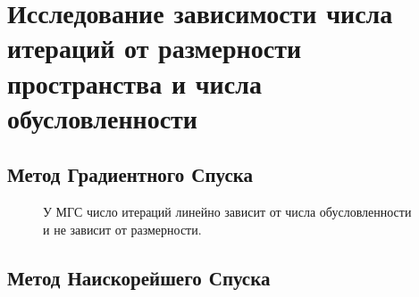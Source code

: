 \documentclass[a4paper,12pt]{article}
\begin{document}
\section{Исследование зависимости числа итераций от размерности пространства и числа обусловленности}

\subsection{Метод Градиентного Спуска}

\begin{figure}[h]
\caption{У МГС число итераций линейно зависит от числа обусловленности и не зависит от размерности.}
\end{figure}

\clearpage

\subsection{Метод Наискорейшего Спуска}
\end{document}
